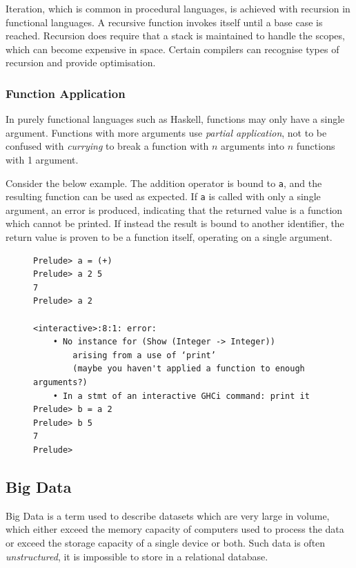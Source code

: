 \documentclass[10pt]{article}
\begin{document}
Iteration, which is common in procedural languages, is achieved with recursion in functional languages. A recursive function invokes itself until a base case is reached. Recursion does require that a stack is maintained to handle the scopes, which can become expensive in space. Certain compilers can recognise types of recursion and provide optimisation.

\subsubsection{Function Application}
\label{sec:org9a5f5d5}

In purely functional languages such as Haskell, functions may only have a single argument. Functions with more arguments use \emph{partial application}, not to be confused with \emph{currying} to break a function with \(n\) arguments into \(n\) functions with 1 argument.

Consider the below example. The addition operator is bound to \texttt{a}, and the resulting function can be used as expected. If \texttt{a} is called with only a single argument, an error is produced, indicating that the returned value is a function which cannot be printed. If instead the result is bound to another identifier, the return value is proven to be a function itself, operating on a single argument.

\begin{figure}[H]
\begin{verbatim}
Prelude> a = (+)
Prelude> a 2 5
7
Prelude> a 2

<interactive>:8:1: error:
    • No instance for (Show (Integer -> Integer))
        arising from a use of ‘print’
        (maybe you haven't applied a function to enough arguments?)
    • In a stmt of an interactive GHCi command: print it
Prelude> b = a 2
Prelude> b 5
7
Prelude>
\end{verbatim}
\end{figure}

\subsection{Big Data}
\label{sec:orgf8df50a}

Big Data is a term used to describe datasets which are very large in volume, which either exceed the memory capacity of computers used to process the data or exceed the storage capacity of a single device or both. Such data is often \emph{unstructured}, it is impossible to store in a relational database.
\end{document}
